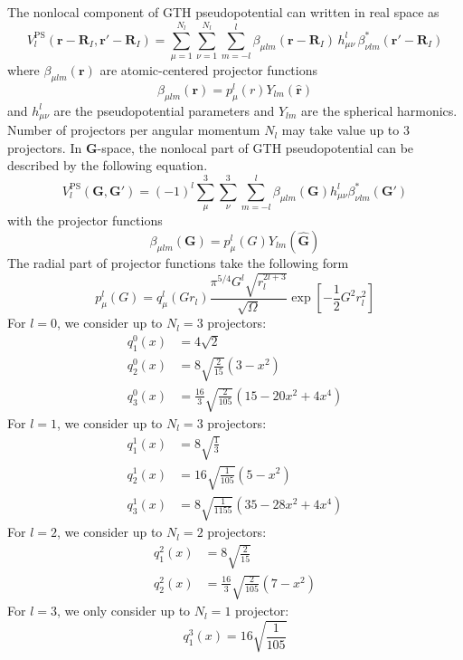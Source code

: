 The nonlocal component of GTH pseudopotential can written in real space as
\begin{equation}
V^{\mathrm{PS}}_{l}(\mathbf{r}-\mathbf{R}_{I},\mathbf{r}'-\mathbf{R}_{I}) =
\sum_{\mu=1}^{N_{l}} \sum_{\nu=1}^{N_{l}} \sum_{m=-l}^{l}
\beta_{\mu lm}(\mathbf{r}-\mathbf{R}_{I})\,
h^{l}_{\mu\nu}\,
\beta^{*}_{\nu lm}(\mathbf{r}'-\mathbf{R}_{I})
\end{equation}
where $\beta_{\mu lm}(\mathbf{r})$ are atomic-centered projector functions
\begin{equation}
\beta_{\mu lm}(\mathbf{r}) =
p^{l}_{\mu}(r) Y_{lm}(\hat{\mathbf{r}})
\label{eq:proj_NL_R}
\end{equation}
%
and $h^{l}_{\mu\nu}$ are the pseudopotential parameters and
$Y_{lm}$ are the spherical harmonics. Number of projectors per angular
momentum $N_{l}$ may take value up to 3 projectors.
%
In $\mathbf{G}$-space, the nonlocal part of GTH pseudopotential can be described by
the following equation.
\begin{equation}
V^{\mathrm{PS}}_{l}(\mathbf{G},\mathbf{G}') =
(-1)^{l} \sum_{\mu}^{3} \sum_{\nu}^{3}\sum_{m=-l}^{l}
\beta_{\mu l m}(\mathbf{G}) h^{l}_{\mu\nu}
\beta^{*}_{\nu l m}(\mathbf{G}')
\end{equation}
with the projector functions
\begin{equation}
\beta_{\mu lm}(\mathbf{G}) = p^{l}_{\mu}(G) Y_{lm}(\hat{\mathbf{G}})
\label{eq:betaNL_G}
\end{equation}
The radial part of projector functions take the following form
\begin{equation}
p^{l}_{\mu}(G) = q^{l}_{\mu}\left(Gr_{l}\right)
\frac{\pi^{5/4}G^{l}\sqrt{ r_{l}^{2l+3}}}{\sqrt{\Omega}}
\exp\left[-\frac{1}{2}G^{2}r^{2}_{l}\right]
\label{eq:proj_NL_G}
\end{equation}
%
For $l=0$, we consider up to $N_{l}=3$ projectors:
\begin{align}
q^{0}_{1}(x) & = 4\sqrt{2} \\
q^{0}_{2}(x) & = 8\sqrt{\frac{2}{15}}(3 - x^2) \\
q^{0}_{3}(x) & = \frac{16}{3}\sqrt{\frac{2}{105}} (15 - 20x^2 + 4x^4)
\end{align}
%
For $l=1$, we consider up to $N_{l}=3$ projectors:
\begin{align}
q^{1}_{1}(x) & = 8 \sqrt{\frac{1}{3}} \\
q^{1}_{2}(x) & = 16 \sqrt{\frac{1}{105}} (5 - x^2) \\
q^{1}_{3}(x) & = 8 \sqrt{\frac{1}{1155}} (35 - 28x^2 + 4x^4)
\end{align}
%
For $l=2$, we consider up to $N_{l}=2$ projectors:
\begin{align}
q^{2}_{1}(x) & = 8\sqrt{\frac{2}{15}} \\
q^{2}_{2}(x) & = \frac{16}{3} \sqrt{\frac{2}{105}}(7 - x^2)
\end{align}
%
For $l=3$, we only consider up to $N_{l}=1$ projector:
\begin{equation}
q^{3}_{1}(x) = 16\sqrt{\frac{1}{105}}
\end{equation}


